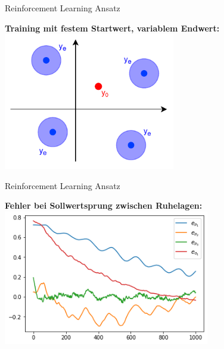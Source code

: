\documentclass[
	ngerman,
	10pt,				%
	aspectratio=169, 	%
	xcolor=dvipsnames
]{beamer}
\newcommand{\backupend}{
   \setcounter{framenumber}{\value{finalframe}}
}
\begin{document}
\begin{frame}[t,fragile,label=CCodeGen]{\large Reinforcement Learning Ansatz}
	
	\textbf{Training mit festem Startwert, variablem Endwert:}
	\includegraphics[width=75mm]{images/RL_reference_values}
	
\end{frame}


\begin{frame}[t,fragile,label=CCodeGen]{\large Reinforcement Learning Ansatz}
	
	\textbf{Fehler bei Sollwertsprung zwischen Ruhelagen:}
	\includegraphics[width=90mm]{images/RL_simulation_errors}
	
\end{frame}


\backupend
\end{document}
